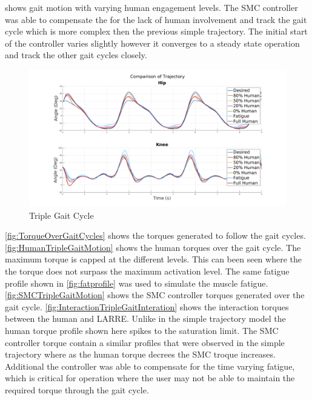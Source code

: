 \author{fig:TripleGaitMotion} shows gait motion with varying human engagement levels. The SMC controller was able to compensate the for the lack of human involvement and track the gait cycle which is more complex then the previous simple trajectory. The initial start of the controller varies slightly however it converges to a steady state operation and track the other gait cycles closely. 

\begin{figure}
    \centering
    \includegraphics[width=\columnwidth]{images/controllers/gait/traj.png}
    \caption{Triple Gait Cycle}
    \label{fig:TripleGaitMotion}
\end{figure}



\autoref{fig:TorqueOverGaitCycles} shows the torques generated to follow the gait cycles. \autoref{fig:HumanTripleGaitMotion} shows the human torques over the gait cycle. The maximum torque is capped at the different levels. This can been seen where the the torque does not surpass the maximum activation level. The same fatigue profile shown in \autoref{fig:fatprofile} was used to simulate the muscle fatigue. \autoref{fig:SMCTripleGaitMotion} shows the SMC controller torques generated over the gait cycle. \autoref{fig:InteractionTripleGaitInteration} shows the interaction torques between the human and LARRE. Unlike in the simple trajectory model the human torque profile shown here spikes to the saturation limit. The SMC controller torque contain a similar profiles that were observed in the simple trajectory where as the human torque decrees the SMC troque increases. Additional the controller was able to compensate for the time varying fatigue, which is critical for operation where the user may not be able to maintain the required torque through the gait cycle. 

